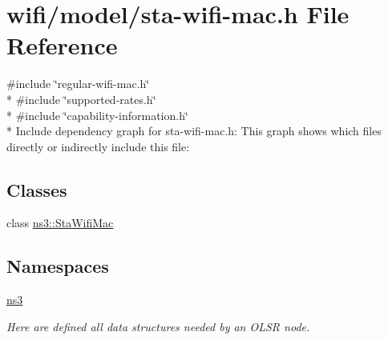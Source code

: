 \hypertarget{sta-wifi-mac_8h}{}\section{wifi/model/sta-\/wifi-\/mac.h File Reference}
\label{sta-wifi-mac_8h}
{\ttfamily \#include \char`\"{}regular-\/wifi-\/mac.\+h\char`\"{}}\\*
{\ttfamily \#include \char`\"{}supported-\/rates.\+h\char`\"{}}\\*
{\ttfamily \#include \char`\"{}capability-\/information.\+h\char`\"{}}\\*
Include dependency graph for sta-\/wifi-\/mac.h\+:
This graph shows which files directly or indirectly include this file\+:
\subsection*{Classes}
\begin{DoxyCompactItemize}
\item 
class \hyperlink{classns3_1_1StaWifiMac}{ns3\+::\+Sta\+Wifi\+Mac}
\end{DoxyCompactItemize}
\subsection*{Namespaces}
\begin{DoxyCompactItemize}
\item 
 \hyperlink{namespacens3}{ns3}
\begin{DoxyCompactList}\small\item\em Here are defined all data structures needed by an O\+L\+SR node. \end{DoxyCompactList}\end{DoxyCompactItemize}
